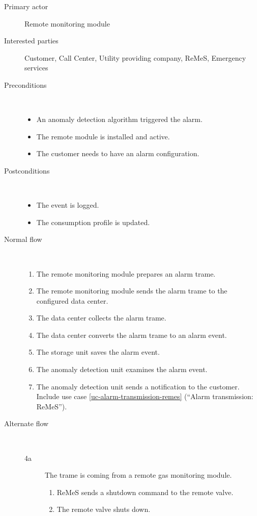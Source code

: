 \begin{description}
	\item[Primary actor] Remote monitoring module
	\item[Interested parties] Customer, Call Center, Utility providing company,
	ReMeS, Emergency services
	\item[Preconditions] \ 
	\begin{itemize}
	  	\item An anomaly detection algorithm triggered the alarm.
		\item The remote module is installed and active.
		\item The customer needs to have an alarm configuration.
	\end{itemize}
	\item[Postconditions] \ 
	\begin{itemize}
		\item The event is logged.
		\item The consumption profile is updated.
	\end{itemize}
	\item[Normal flow] \ 
	\begin{enumerate}
	  	\item The remote monitoring module prepares an alarm trame.
	  	\item The remote monitoring module sends the alarm trame to the configured
	  	data center. 
	  	\item The data center collects the alarm trame.
		\item The data center converts the alarm trame to an alarm event.
		\item The storage unit saves the alarm event.
	  	\item The anomaly detection unit examines the alarm event.
	  	\item The anomaly detection unit sends a notification to the customer.
	  	Include use case \ref{uc-alarm-transmission-remes} (``Alarm transmission: ReMeS'').
	\end{enumerate}
	\item[Alternate flow] \ 
	\begin{description}
		\item[4a] The trame is coming from a remote gas monitoring module.
			\begin{enumerate}
				\item ReMeS sends a shutdown command to the remote valve.
				\item The remote valve shuts down.

\end{enumerate}
\end{description}
\end{description}
